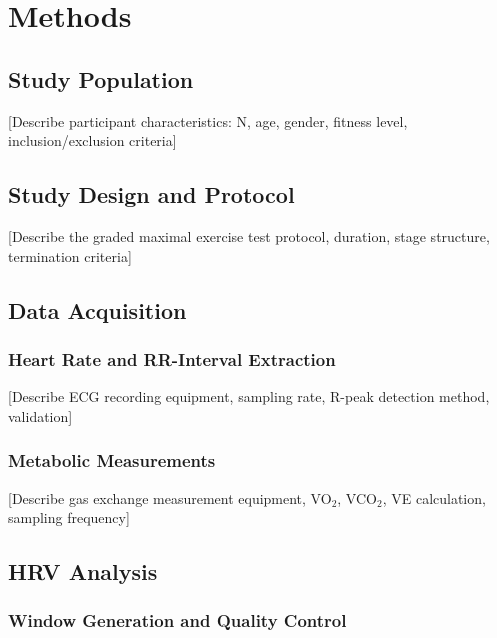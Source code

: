 \documentclass[12pt,a4paper]{article}
\begin{document}

\section*{Methods}

\subsection*{Study Population}

[Describe participant characteristics: N, age, gender, fitness level, inclusion/exclusion criteria]

\subsection*{Study Design and Protocol}

[Describe the graded maximal exercise test protocol, duration, stage structure, termination criteria]

\subsection*{Data Acquisition}

\subsubsection*{Heart Rate and RR-Interval Extraction}

[Describe ECG recording equipment, sampling rate, R-peak detection method, validation]

\subsubsection*{Metabolic Measurements}

[Describe gas exchange measurement equipment, VO$_2$, VCO$_2$, VE calculation, sampling frequency]

\subsection*{HRV Analysis}

\subsubsection*{Window Generation and Quality Control}
\end{document}
